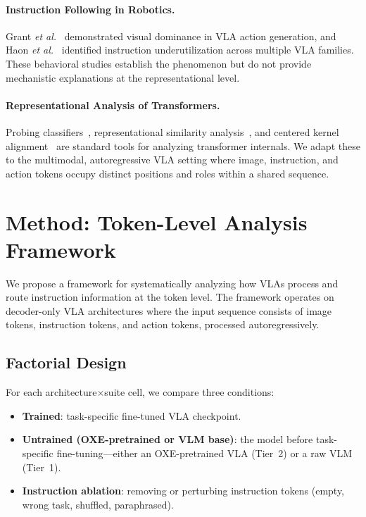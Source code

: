 \documentclass[letterpaper]{article}
\newcommand{\etal}{\textit{et al.}}
\begin{document}
\paragraph{Instruction Following in Robotics.}
Grant \etal~\cite{grant2026visual} demonstrated visual dominance in VLA action generation, and Haon \etal~\cite{haon2025lost} identified instruction underutilization across multiple VLA families.
These behavioral studies establish the phenomenon but do not provide mechanistic explanations at the representational level.

\paragraph{Representational Analysis of Transformers.}
Probing classifiers~\cite{belinkov2022probing}, representational similarity analysis~\cite{kriegeskorte2008representational}, and centered kernel alignment~\cite{kornblith2019similarity} are standard tools for analyzing transformer internals.
We adapt these to the multimodal, autoregressive VLA setting where image, instruction, and action tokens occupy distinct positions and roles within a shared sequence.

\section{Method: Token-Level Analysis Framework}
\label{sec:method}

We propose a framework for systematically analyzing how VLAs process and route instruction information at the token level.
The framework operates on decoder-only VLA architectures where the input sequence consists of image tokens, instruction tokens, and action tokens, processed autoregressively.

\subsection{Factorial Design}
For each architecture$\times$suite cell, we compare three conditions:
\begin{itemize}
  \item \textbf{Trained}: task-specific fine-tuned VLA checkpoint.
  \item \textbf{Untrained (OXE-pretrained or VLM base)}: the model before task-specific fine-tuning---either an OXE-pretrained VLA (Tier~2) or a raw VLM (Tier~1).
  \item \textbf{Instruction ablation}: removing or perturbing instruction tokens (empty, wrong task, shuffled, paraphrased).
\end{itemize}
\end{document}
